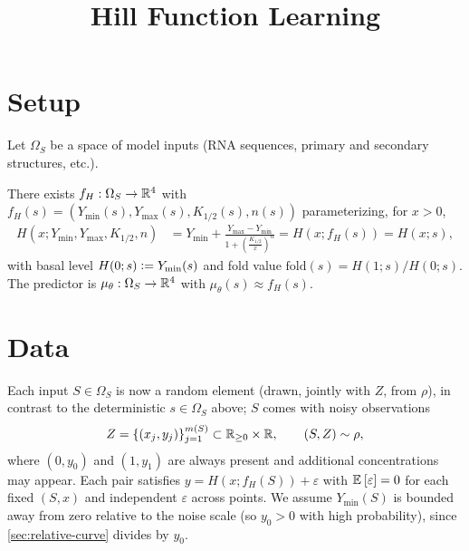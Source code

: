 \documentclass{article}
\title{Hill Function Learning}
\newcommand{\distr}{\rho}
\theoremstyle{plain}
\theoremstyle{remark}
\begin{document}
\maketitle
\section{Setup}
Let $\Omega_S$ be a space of model inputs (RNA sequences, primary and secondary structures, etc.).

There exists $f_{H}:\Omega_S\to\mathbb{R}^4$ with $f_{H}(s)=(Y_{\min}(s),Y_{\max}(s),K_{1/2}(s),n(s))$ parameterizing, for $x>0$,
\begin{align*}
    H(x;Y_{\min},Y_{\max},K_{1/2},n)
     & = Y_{\min} + \frac{Y_{\max} - Y_{\min}}{1 + \left(\frac{K_{1/2}}{x}\right)^n}
     = H(x;f_{H}(s)) = H(x;s),
\end{align*}
with basal level $H(0;s)\vcentcolon= Y_{\min}(s)$ and fold value $\mathrm{fold}(s)=H(1;s)/H(0;s)$.
The predictor is $\mu_{\theta}:\Omega_S\to\mathbb{R}^4$ with $\mu_{\theta}(s)\approx f_{H}(s)$.

\section{Data}
\label{sec:data}
Each input $S\in\Omega_S$ is now a random element (drawn, jointly with $Z$, from $\distr$), in contrast to the deterministic $s\in\Omega_S$ above; $S$ comes with noisy observations
\[
    Z = \{(x_j, y_j)\}_{j=1}^{m(S)} \subset \RR_{\ge0} \times \RR,
    \qquad (S,Z)\sim\distr,
\]
where $(0,y_0)$ and $(1,y_1)$ are always present and additional concentrations may appear.
Each pair satisfies $y = H(x;f_H(S)) + \varepsilon$ with $\mathbb{E}_{}\left[{\varepsilon}\right]=0$ for each fixed $(S,x)$ and independent $\varepsilon$ across points.
We assume $Y_{\min}(S)$ is bounded away from zero relative to the noise scale (so $y_0>0$ with high probability), since \cref{sec:relative-curve} divides by $y_0$.
\end{document}
